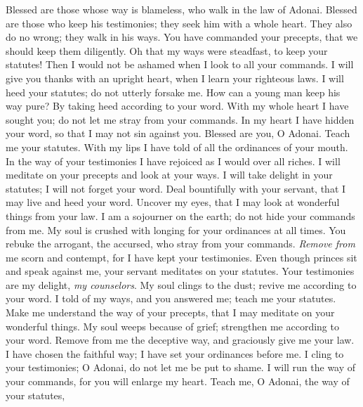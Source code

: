 \begin{biblechapter} %
 Blessed are those whose way is blameless, 
who walk in the law of Adonai.
\verse Blessed are those who keep his testimonies; 
they seek him with a whole heart.
\verse They also do no wrong; 
they walk in his ways.
\verse You have commanded your precepts, 
that we should keep them diligently.
\verse Oh that my ways were steadfast, 
to keep your statutes!
\verse Then I would not be ashamed 
when I look to all your commands.
\verse I will give you thanks with an upright heart, 
when I learn your righteous laws.
\verse I will heed your statutes; 
do not utterly forsake me.
 How can a young man keep his way pure? 
By taking heed according to your word.
\verse With my whole heart I have sought you; 
do not let me stray from your commands.
\verse In my heart I have hidden your word, 
so that I may not sin against you.
\verse Blessed are you, O Adonai. 
Teach me your statutes.
\verse With my lips I have told of 
all the ordinances of your mouth.
\verse In the way of your testimonies I have rejoiced 
as I would over all riches.
\verse I will meditate on your precepts 
and look at your ways.
\verse I will take delight in your statutes; 
I will not forget your word.
 Deal bountifully with your servant, that I may live 
and heed your word.
\verse Uncover my eyes, that I may look at 
wonderful things from your law.
\verse I am a sojourner on the earth; 
do not hide your commands from me.
\verse My soul is crushed with longing 
for your ordinances at all times.
\verse You rebuke the arrogant, the accursed, 
who stray from your commands.
\verse \textit{Remove from} me scorn and contempt, 
for I have kept your testimonies.
\verse Even though princes sit and speak against me, 
your servant meditates on your statutes.
\verse Your testimonies are my delight, 
\textit{my counselors}.
 My soul clings to the dust; 
revive me according to your word.
\verse I told of my ways, and you answered me; 
teach me your statutes.
\verse Make me understand the way of your precepts, 
that I may meditate on your wonderful things.
\verse My soul weeps because of grief; 
strengthen me according to your word.
\verse Remove from me the deceptive way, 
and graciously give me your law.
\verse I have chosen the faithful way; 
I have set your ordinances before me.
\verse I cling to your testimonies; 
O Adonai, do not let me be put to shame.
\verse I will run the way of your commands, 
for you will enlarge my heart.
 Teach me, O Adonai, the way of your statutes, 

\end{biblechapter}
